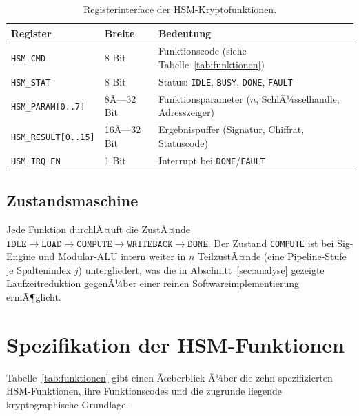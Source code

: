 ﻿\documentclass[a4paper,12pt]{article}
\theoremstyle{definition}
\begin{document}
\begin{table}[h]
	\centering
	\small
	\begin{tabular}{@{}lll@{}}
		\toprule
		Register & Breite & Bedeutung \\
		\midrule
		\texttt{HSM\_CMD} & 8 Bit & Funktionscode (siehe Tabelle~\ref{tab:funktionen}) \\
		\texttt{HSM\_STAT} & 8 Bit & Status: \texttt{IDLE}, \texttt{BUSY}, \texttt{DONE}, \texttt{FAULT} \\
		\texttt{HSM\_PARAM[0..7]} & 8Ã—32 Bit & Funktionsparameter ($n$, SchlÃ¼sselhandle, Adresszeiger) \\
		\texttt{HSM\_RESULT[0..15]} & 16Ã—32 Bit & Ergebnispuffer (Signatur, Chiffrat, Statuscode) \\
		\texttt{HSM\_IRQ\_EN} & 1 Bit & Interrupt bei \texttt{DONE}/\texttt{FAULT} \\
		\bottomrule
	\end{tabular}
	\caption{Registerinterface der HSM-Kryptofunktionen.}
	\label{tab:register}
\end{table}

\subsection{Zustandsmaschine}

Jede Funktion durchlÃ¤uft die ZustÃ¤nde $\texttt{IDLE} \to \texttt{LOAD} \to \texttt{COMPUTE} \to \texttt{WRITEBACK} \to \texttt{DONE}$. Der Zustand \texttt{COMPUTE} ist bei Sig-Engine und Modular-ALU intern weiter in $n$ TeilzustÃ¤nde (eine Pipeline-Stufe je Spaltenindex $j$) untergliedert, was die in Abschnitt~\ref{sec:analyse} gezeigte Laufzeitreduktion gegenÃ¼ber einer reinen Softwareimplementierung ermÃ¶glicht.

\section{Spezifikation der HSM-Funktionen}
\label{sec:funktionen}

Tabelle~\ref{tab:funktionen} gibt einen Ãœberblick Ã¼ber die zehn spezifizierten HSM-Funktionen, ihre Funktionscodes und die zugrunde liegende kryptographische Grundlage.
\end{document}
